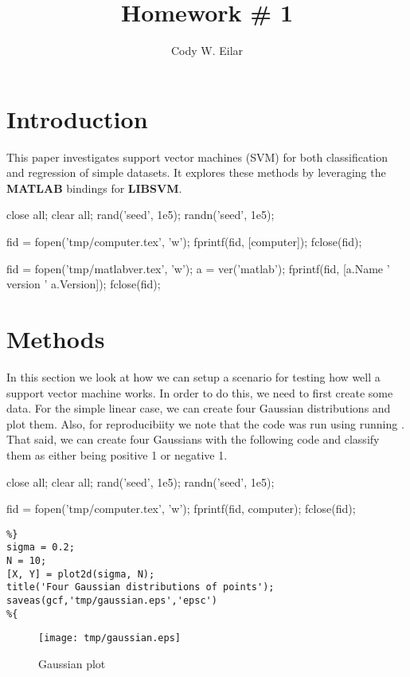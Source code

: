 \documentclass[11pt, twoside]{article}   	%
\title{Homework \# 1}
\author{Cody W. Eilar}
\newenvironment{matlab}{\comment}{\endcomment}
\begin{document}
\maketitle
\section{Introduction} 
This paper investigates support vector machines (SVM) for both classification 
and regression of simple datasets. It explores these methods by leveraging
the \textbf{MATLAB} bindings for \textbf{LIBSVM}. 

\begin{matlab}
close all; 
clear all;
rand('seed', 1e5);
randn('seed', 1e5);

fid = fopen('tmp/computer.tex', 'w'); 
fprintf(fid, [computer]); 
fclose(fid); 

fid = fopen('tmp/matlabver.tex', 'w'); 
a = ver('matlab'); 
fprintf(fid, [a.Name ' version ' a.Version]); 
fclose(fid); 
\end{matlab}

\section{Methods}
 In this section we look at how we can setup a scenario 
for testing how well a support vector machine works. In order to do this, 
we need to first create some data. For the simple linear case, we can create
four Gaussian distributions and plot them. Also, for reproducibiity 
we note that the code was run using  running
  . That said, we can create four Gaussians
with the following code and classify them as either being positive 1 or negative 1. 

\begin{matlab}
close all; 
clear all;
rand('seed', 1e5);
randn('seed', 1e5);

fid = fopen('tmp/computer.tex', 'w'); 
fprintf(fid, computer); 
fclose(fid); 
\end{matlab}

\begin{lstlisting}
%}
sigma = 0.2; 
N = 10; 
[X, Y] = plot2d(sigma, N);
title('Four Gaussian distributions of points'); 
saveas(gcf,'tmp/gaussian.eps','epsc')
%{
\end{lstlisting}  


\begin{figure}[h]
\centering
\texttt{[image: tmp/gaussian.eps]}
\caption{Gaussian plot}
\label{fig:gaus} 
\end{figure}
\end{document}
